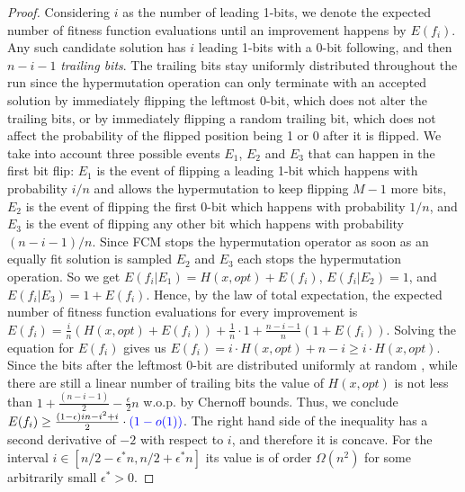 \documentclass[lettersize,journal]{IEEEtran}
\begin{document}
\begin{proof}
Considering $i$ as the number of leading 1-bits, we denote the expected number of fitness function evaluations until an improvement happens by $E(f_i)$. Any such candidate solution has $i$ leading 1-bits with a 0-bit following, and then $n-i-1$ \emph{trailing bits}. The trailing bits stay uniformly distributed throughout the run since the hypermutation operation can only terminate with an accepted solution by immediately flipping the leftmost $0$-bit, which does not alter the trailing bits, or by immediately flipping a random trailing bit, which does not affect the probability of the flipped position being 1 or 0 after it is flipped\cite{DrosteJansenWegener2002}.   We take into account three possible events $E_1$, $E_2$ and $E_3$ that can happen in the first bit flip: $E_1$ is the event of flipping a leading 1-bit which happens with probability $i/n$ {\color{blue} and allows the hypermutation to keep flipping $M-1$ more bits}, $E_2$ is the event of flipping the first 0-bit which happens with probability $1/n$, and $E_3$ is the event of flipping any other bit which happens with probability $(n-i-1)/n$. {\color{blue}Since FCM stops the hypermutation operator as soon as an equally fit solution is sampled $E_2$ and $E_3$ each stops the hypermutation operation.} So we get $E(f_i|E_1)=H(x,opt)+ E(f_i)$, $E(f_i|E_2)=1$, and $E(f_i|E_3)=1+ E(f_i)$. Hence, by the law of total expectation, the expected number of fitness function evaluations for every improvement is $ E(f_i) = \frac{i}{n} \left( H(x,opt)+ E(f_i)\right) + \frac{1}{n} \cdot 1 +\frac{n-i-1}{n} \left( 1+ E(f_i)\right)$. Solving the equation for $E(f_i)$ gives us $E(f_i)=
i\cdot H(x,opt)+n-i\geq i\cdot H(x,opt) $. Since the bits after the leftmost 0-bit are distributed uniformly at random \cite{DrosteJansenWegener2002}, {\color{blue} while there are still a linear number of trailing bits} the value of $H(x,opt)$ is not less than $1+ \frac{(n-i-1)}{2}- \frac{\epsilon }{2}n$ w.o.p. by Chernoff bounds. Thus, we conclude $E(f_i) \geq \frac{(1-\epsilon)in-i^2+i}{2}\cdot {\color{blue}(1-o(1))}$. The right hand side of the inequality has a second derivative of $-2$ with respect to $i$, and therefore it is concave. For the interval $i\in [n/2-\epsilon^*n, n/2+\epsilon^*n]$ its value is of order $\Omega(n^2)$ for some   arbitrarily small $\epsilon^*>0$.



\end{proof}
\end{document}
